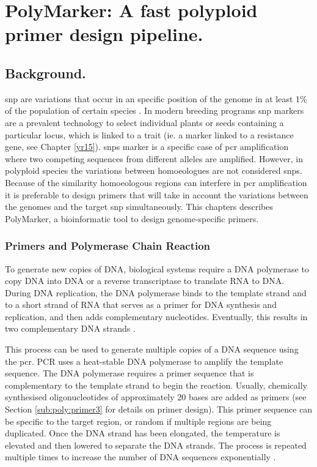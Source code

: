 
\chapter{PolyMarker: A fast polyploid primer design pipeline.}
\glsresetall
\label{cha:polymarker}
\section{Background.}


\gls{snp} are variations that occur in an specific position of the genome in at least 1\% of the population of certain species \citep{Jehan2006}. 
In modern breeding programs \gls{snp} markers are a prevalent technology to select individual plants or seeds containing a particular locus, which is linked to a trait (ie. a marker linked to a resistance gene, see Chapter \ref{yr15}). 
\glspl{snp} marker is a specific case of \gls{pcr} amplification where two competing sequences from different alleles are amplified. 
However, in polyploid species the variations between homoeologues are not considered \glspl{snp}.
Because of the similarity homoeologous regions can interfere in \gls{pcr} amplification it is preferable to design primers that will take in account the variations between the genomes and the target \gls{snp} simultaneously. 
This chapters describes PolyMarker, a bioinformatic tool to design genome-specific primers. 


\subsection{Primers and Polymerase Chain Reaction}
\label{sub:poly:pcr}
To generate new copies of DNA, biological systems require a DNA polymerase to copy DNA into DNA or a reverse transcriptase to translate RNA to DNA. During DNA replication, the DNA polymerase binds to the template strand and to a short strand of RNA that serves as a primer for DNA synthesis and replication, and then adds complementary nucleotides. Eventually, this results in two complementary DNA strands \citep{mullis1987process}.

This process can be used to generate multiple copies of a DNA sequence using the \gls{pcr}. 
PCR uses a heat-stable DNA polymerase to amplify the template sequence. 
The DNA polymerase requires a primer sequence that is complementary to the template strand to begin the reaction. Usually, chemically synthesised oligonucleotides of approximately 20 bases are added as primers (see Section \ref{sub:poly:primer3} for details on primer design). 
This primer sequence can be specific to the target region, or random if multiple regions are being duplicated. 
Once the DNA strand has been elongated, the temperature is elevated and then lowered to separate the DNA strands. 
The process is repeated multiple times to increase the number of DNA sequences exponentially \cite{alberts2014molecular}.

